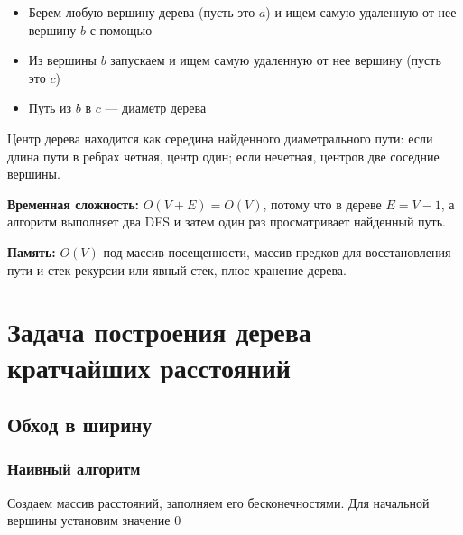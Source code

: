 \documentclass[a4paper]{article}
\begin{document}
\begin{itemize}
    \item Берем любую вершину дерева (пусть это $a$) и ищем самую удаленную от нее вершину $b$ с помощью \dfs
    \item Из вершины $b$ запускаем \dfs и ищем самую удаленную от нее вершину (пусть это $c$)
    \item Путь из $b$ в $c$ — диаметр дерева
\end{itemize}

Центр дерева находится как середина найденного диаметрального пути: если длина пути в ребрах четная, центр один; если нечетная, центров две соседние вершины.

\textbf{Временная сложность:} $O(V+E)=O(V)$, потому что в дереве $E=V-1$, а алгоритм выполняет два DFS и затем один раз просматривает найденный путь.

\textbf{Память:} $O(V)$ под массив посещенности, массив предков для восстановления пути и стек рекурсии или явный стек, плюс хранение дерева.



\newpage
\section{Задача построения дерева кратчайших расстояний}
\subsection{Обход в ширину}
\subsubsection*{Наивный алгоритм}
Создаем массив расстояний, заполняем его бесконечностями. Для начальной вершины установим значение 0
\end{document}
